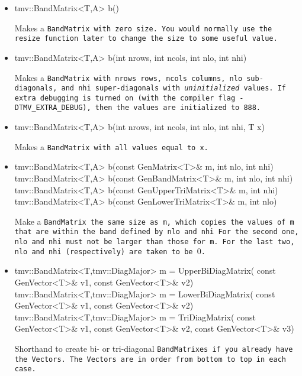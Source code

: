\begin{itemize}

\item
\begin{tmvcode}
tmv::BandMatrix<T,A> b()
\end{tmvcode}
Makes a \tt{BandMatrix} with zero size.  You would normally use the \tt{resize} function later to
change the size to some useful value.

\item 
\begin{tmvcode}
tmv::BandMatrix<T,A> b(int nrows, int ncols, 
      int nlo, int nhi)
\end{tmvcode}
Makes a \tt{BandMatrix} with \tt{nrows} rows, \tt{ncols} columns, 
\tt{nlo} sub-diagonals,
and \tt{nhi} super-diagonals with {\em uninitialized} values.
If extra debugging is turned on (with the compiler flag \tt{-DTMV\_EXTRA\_DEBUG}), then the values are initialized to 888.

\item
\begin{tmvcode}
tmv::BandMatrix<T,A> b(int nrows, int ncols, 
      int nlo, int nhi, T x)
\end{tmvcode}
Makes a \tt{BandMatrix} with all values equal to \tt{x}.

\item 
\begin{tmvcode}
tmv::BandMatrix<T,A> b(const GenMatrix<T>& m, int nlo, int nhi)
tmv::BandMatrix<T,A> b(const GenBandMatrix<T>& m, int nlo, int nhi)
tmv::BandMatrix<T,A> b(const GenUpperTriMatrix<T>& m, int nhi)
tmv::BandMatrix<T,A> b(const GenLowerTriMatrix<T>& m, int nlo)
\end{tmvcode}
Make a \tt{BandMatrix} the same size as \tt{m}, which copies the values of \tt{m}
that are within the band defined by \tt{nlo} and \tt{nhi}
For the second one, \tt{nlo} and \tt{nhi} must not be larger than those for \tt{m}.
For the last two, \tt{nlo} and \tt{nhi} (respectively) are taken to be $0$.

\item
\begin{tmvcode}
tmv::BandMatrix<T,tmv::DiagMajor> m = UpperBiDiagMatrix(
      const GenVector<T>& v1, const GenVector<T>& v2)
tmv::BandMatrix<T,tmv::DiagMajor> m = LowerBiDiagMatrix(
      const GenVector<T>& v1, const GenVector<T>& v2)
tmv::BandMatrix<T,tmv::DiagMajor> m = TriDiagMatrix(
      const GenVector<T>& v1,  const GenVector<T>& v2, 
      const GenVector<T>& v3)
\end{tmvcode}
Shorthand to create bi- or tri-diagonal \tt{BandMatrix}es if you already have the 
\tt{Vector}s.  The \tt{Vector}s are in order from bottom to top in each case.


\end{itemize}
